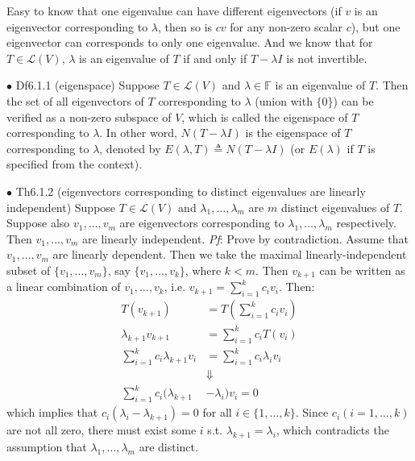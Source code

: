 \documentclass{article}
\begin{document}
\begin{Rmk}{}
    Easy to know that \textcolor{Th}{one eigenvalue can have different eigenvectors (if $v$ is an eigenvector corresponding to $\lambda$, then so is $cv$ for any non-zero scalar $c$), but one eigenvector can corresponds to only one eigenvalue.} And we know that \textcolor{Th}{for $T\in\mathcal{L}(V)$, $\lambda$ is an eigenvalue of $T$ if and only if $T-\lambda I$ is not invertible.}
\end{Rmk}

\begin{Df}{$\bullet$ Df6.1.1 (eigenspace)}
    Suppose $T\in\mathcal{L}(V)$ and $\lambda\in\mathbb{F}$ is an eigenvalue of $T$. \textcolor{Th}{Then the set of all eigenvectors of $T$ corresponding to $\lambda$ (union with $\{0\}$) can be verified as a non-zero subspace of $V$}, which is called the eigenspace of $T$ corresponding to $\lambda$. In other word, $N(T-\lambda I)$ is the eigenspace of $T$ corresponding to $\lambda$, denoted by $E(\lambda, T)\triangleq N(T-\lambda I)$ (or $E(\lambda)$ if $T$ is specified from the context).
\end{Df}

\begin{Th}{$\bullet$ Th6.1.2 (eigenvectors corresponding to distinct eigenvalues are linearly independent)}
    Suppose $T\in\mathcal{L}(V)$ and $\lambda_1, \dots, \lambda_m$ are $m$ distinct eigenvalues of $T$. Suppose also $v_1,\dots, v_m$ are eigenvectors corresponding to $\lambda_1, \dots, \lambda_m$ respectively. Then $v_1, \dots, v_m$ are linearly independent.
    \tcblower
    \textit{Pf}: Prove by contradiction. Assume that $v_1, \dots, v_m$ are linearly dependent. Then we take the maximal linearly-independent subset of $\{v_1, \dots, v_m\}$, say $\{v_1, \dots, v_k\}$, where $k<m$. Then $v_{k+1}$ can be written as a linear combination of $v_1, \dots, v_k$, i.e. $v_{k+1}=\sum_{i=1}^k c_iv_i$. Then: 
    $$\begin{aligned}
        T(v_{k+1}) &= T\left(\sum_{i=1}^k c_iv_i\right)\\
        \lambda_{k+1}v_{k+1} &= \sum_{i=1}^k c_iT(v_i) \\
        \sum_{i=1}^{k} c_i\lambda_{k+1} v_i &= \sum_{i=1}^k c_i\lambda_iv_i\\
        &\Downarrow\\
        \sum_{i=1}^{k} c_i(\lambda_{k+1}&-\lambda_i)v_i = 0
    \end{aligned} 
    $$
    which implies that $c_i(\lambda_i-\lambda_{k+1})=0$ for all $i\in\{1,\dots, k\}$. Since $c_i (i=1,\dots, k)$ are not all zero, there must exist some $i$ s.t. $\lambda_{k+1}=\lambda_i$, which contradicts the assumption that $\lambda_1, \dots, \lambda_m$ are distinct.
\end{Th}
\end{document}
